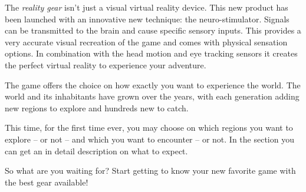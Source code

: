 The \emph{\poke{} reality gear} isn't just a visual virtual reality device. This new product has been launched with an innovative new technique: the neuro-stimulator. Signals can be transmitted to the brain and cause specific sensory inputs. This provides a very accurate visual recreation of the game and comes with physical sensation options. In combination with the head motion and eye tracking sensors it creates the perfect virtual reality to experience your \poke{} adventure. \medskip

The game offers the choice on how exactly you want to experience the \poke{} world. The world and its inhabitants have grown over the years, with each generation adding new regions to explore and hundreds new \poke{} to catch.

This time, for the first time ever, you may choose on which regions you want to explore -- or not -- and which  \poke{} you want to encounter -- or not. In the section \textit{} you can get an in detail description on what to expect.

So what are you waiting for? Start getting to know your new favorite \poke{} game with the best gear available!

